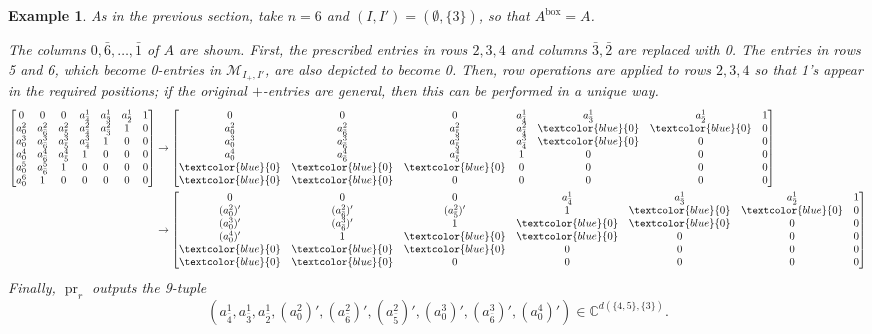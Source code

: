 \documentclass[12pt]{amsart}
\newtheorem{example}[definition]{Example}
\DeclareMathOperator{\inbox}{box}
\DeclareMathOperator{\pr}{pr}
\newcommand{\bC}{\mathbb{C}}
\newcommand{\cM}{\mathcal{M}}
\begin{document}
\begin{example}\label{eg:pr_r}
As in the previous section, take $n=6$ and $(I,I')=(\emptyset,\{3\})$, so that $A^{\inbox}=A$. 

The columns $0,\bar6,\ldots,\bar1$ of $A$ are shown. First, the prescribed entries in rows $2,3,4$ and columns $\bar3,\bar2$ are replaced with 0. The entries in rows 5 and 6, which become 0-entries in $\cM_{I_+,I'}$, are also depicted to become 0. Then, row operations are applied to rows $2,3,4$ so that 1's appear in the required positions; if the original $+$-entries are general, then this can be performed in a unique way. 
\begin{align*}
    \begin{bmatrix}
 0 & 0 & 0 & a^1_{\bar4} & a^1_{\bar3} & a^1_{\bar2} & 1 \\
 a^2_0 & a^2_{\bar6} & a^2_{\bar5} & a^2_{\bar4} & a^2_{\bar3} & 1 & 0\\
 a^3_0 & a^3_{\bar6} & a^3_{\bar5} & a^3_{\bar4} & 1  & 0 & 0 \\
 a^4_0 & a^4_{\bar6} & a^4_{\bar5} & 1 & 0 & 0 & 0 \\
 a^5_0 & a^5_{\bar6} & 1 & 0 & 0 & 0 & 0 \\
 a^6_0 & 1 & 0 & 0 & 0 & 0 & 0 
    \end{bmatrix}
    &\rightarrow
    \begin{bmatrix}
 0 & 0 & 0 & a^1_{\bar4} & a^1_{\bar3} & a^1_{\bar2} & 1 \\
 a^2_0 & a^2_{\bar6} & a^2_{\bar5} & a^2_{\bar4} & \textcolor{blue}{0} & \textcolor{blue}{0} & 0\\
 a^3_0 & a^3_{\bar6} & a^3_{\bar5} & a^3_{\bar4} & \textcolor{blue}{0}  & 0 & 0 \\
 a^4_0 & a^4_{\bar6} & a^4_{\bar5} & 1 & 0 & 0 & 0 \\
 \textcolor{blue}{0}  & \textcolor{blue}{0}  & \textcolor{blue}{0}  & 0 & 0 & 0 & 0 \\
\textcolor{blue}{0}  & \textcolor{blue}{0}  & 0 & 0 & 0 & 0 & 0 
    \end{bmatrix}
    \\
        &\rightarrow
    \begin{bmatrix}
 0 & 0 & 0 & a^1_{\bar4} & a^1_{\bar3} & a^1_{\bar2} & 1 \\
 (a^2_0)' & (a^2_{\bar6})' & (a^2_{\bar5})' & 1 & \textcolor{blue}{0} & \textcolor{blue}{0} & 0\\
 (a^3_0)' & (a^3_{\bar6})' & 1 & \textcolor{blue}{0} & \textcolor{blue}{0}  & 0 & 0 \\
 (a^4_0)' & 1 & \textcolor{blue}{0} & \textcolor{blue}{0} & 0 & 0 & 0 \\
 \textcolor{blue}{0}  & \textcolor{blue}{0}  & \textcolor{blue}{0}  & 0 & 0 & 0 & 0 \\
 \textcolor{blue}{0}  & \textcolor{blue}{0}  & 0 & 0 & 0 & 0 & 0     
    \end{bmatrix}
\end{align*}
Finally, $\pr_r$ outputs the 9-tuple
\begin{equation*}
(a^1_{\bar4},a^1_{\bar3} , a^1_{\bar2},(a^2_0)',  (a^2_{\bar6})' , (a^2_{\bar5})',(a^3_0)' , (a^3_{\bar6})',(a^4_0)')\in \bC^{d(\{4,5\},\{3\})}.
\end{equation*}


\end{example}
\end{document}
